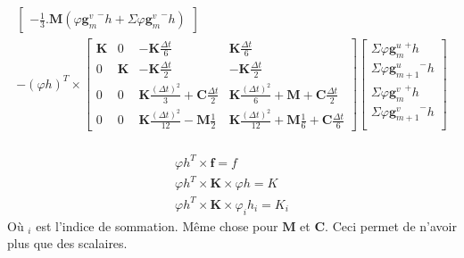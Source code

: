 \documentclass[12pt,a4paper]{report}
\begin{document}
\begin{equation}
\begin{array}{c}
\begin{bmatrix}
			- \frac{1}{3} .  \mathbf{M} (\varphi {\mathbf{g}^v_m}^- h + \Sigma \varphi {\mathbf{g}^v_m}^- h)
	\end{bmatrix}
	\\
	-
	(\varphi h)^T \times
		\begin{bmatrix}   
		   		\mathbf{K}
			&
		   		0
		   	&
			   	-\mathbf{K} \frac{\Delta t}{6} 
		   	&
		   		\mathbf{K} \frac{\Delta t}{6} 
		\\ 	     
			   0 
			&
				\mathbf{K} 
		   	&
		   		-\mathbf{K} \frac{\Delta t}{2} 
		   	&
		   		-\mathbf{K} \frac{\Delta t}{2}
		\\   
		   		0
		   	& 
		   		0
		   	&
			   	\mathbf{K}
			   		\frac{(\Delta t)^2}{3} 
		   		+\mathbf{C} \frac{\Delta t}{2}
		   	&
		   		\mathbf{K} \frac{(\Delta t)^2}{6} 
		   		+\mathbf{M} 
			   	+\mathbf{C} \frac{\Delta t}{2}
		\\    
		   		0
		   	&
		   		0
		   	&
		   		\mathbf{K} \frac{(\Delta t)^2}{12}
		   		-\mathbf{M}
			   		\frac{1}{2} 
		   	&
		   		\mathbf{K} \frac{(\Delta t)^2}{12}
		   		+\mathbf{M} \frac{1}{6} 
			   +\mathbf{C} \frac{\Delta t}{6} 
	\end{bmatrix}
		\begin{bmatrix}
		   \Sigma \varphi {\mathbf{g}^u_m}^+ h 		\\
		   \Sigma \varphi {\mathbf{g}^u_{m+1}}^- h  	\\
		   \Sigma \varphi {\mathbf{g}^v_m}^+ h 		\\
		   \Sigma \varphi {\mathbf{g}^v_{m+1}}^- h 	\\
		\end{bmatrix}
\end{array}
\end{equation}

\begin{equation}
\begin{array}{c}
	\\
	 \varphi h^T \times \mathbf{f} 		= f
	\\
	\varphi h^T \times \mathbf{K} \times \varphi h			= K
	\\
	\varphi h^T \times \mathbf{K} \times \varphi_i h_i	= K_i
\end{array}
\end{equation}
	Où $_i$ est l'indice de sommation.  Même chose pour $\mathbf{M}$ et $\mathbf{C}$.
	Ceci permet de n'avoir plus que des scalaires.
 
\end{document}

